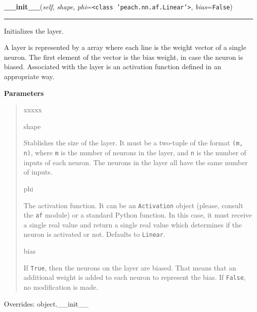     \begin{boxedminipage}{\textwidth}

    \raggedright \textbf{\_\_init\_\_}(\textit{self}, \textit{shape}, \textit{phi}=\texttt{{\textless}class 'peach.nn.af.Linear'{\textgreater}}, \textit{bias}=\texttt{False})

    \vspace{-1.5ex}

    \rule{\textwidth}{0.5\fboxrule}

Initializes the layer.

A layer is represented by a array where each line is the weight vector
of a single neuron. The first element of the vector is the bias weight,
in case the neuron is biased. Associated with the layer is an activation
function defined in an appropriate way.
    \vspace{1ex}

      \textbf{Parameters}
      \begin{quote}
        \begin{Ventry}{xxxxx}

          \item[shape]


Stablishes the size of the layer. It must be a two-tuple of the
format \texttt{(m, n)}, where \texttt{m} is the number of neurons in the
layer, and \texttt{n} is the number of inputs of each neuron. The neurons
in the layer all have the same number of inputs.
          \item[phi]


The activation function. It can be an \texttt{Activation} object (please,
consult the \texttt{af} module) or a standard Python function. In this
case, it must receive a single real value and return a single real
value which determines if the neuron is activated or not. Defaults
to \texttt{Linear}.
          \item[bias]


If \texttt{True}, then the neurons on the layer are biased. That means
that an additional weight is added to each neuron to represent the
bias. If \texttt{False}, no modification is made.
        \end{Ventry}

      \end{quote}

    \vspace{1ex}

      Overrides: object.\_\_init\_\_

    \end{boxedminipage}

